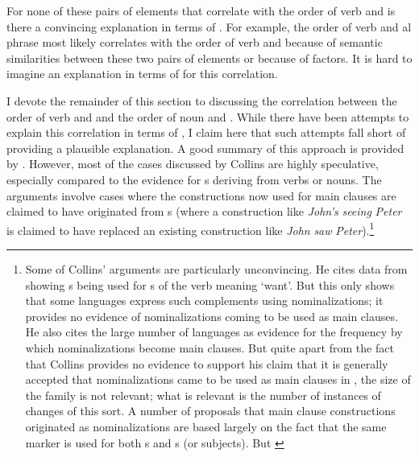 \documentclass[output=paper]{langsci/langscibook}
\begin{document}
For none of these pairs of elements that correlate with the order of verb and  is there a convincing explanation in terms of . For example, the order of verb and al phrase most likely correlates with the order of verb and  because of semantic similarities between these two pairs of elements or because of  factors. It is hard to imagine an explanation in terms of  for this correlation.

I devote the remainder of this section to discussing the correlation between the order of verb and  and the order of noun and . While there have been attempts to explain this correlation in terms of , I claim here that such attempts fall short of providing a plausible explanation. A good summary of this approach is provided by . However, most of the cases discussed by Collins are highly speculative, especially compared to the evidence for s deriving from verbs or nouns. The arguments involve cases where the constructions now used for main clauses are claimed to have originated from s (where a construction like \textit{John’s} \textit{seeing} \textit{Peter} is claimed to have replaced an existing  construction like \textit{John} \textit{saw} \textit{Peter}).\footnote{Some of Collins’ arguments are particularly unconvincing. He cites data from  showing s being used for s of the verb meaning ‘want’. But this only shows that some languages express such complements using nominalizations; it provides no evidence of nominalizations coming to be used as main clauses. He also cites the large number of  languages as evidence for the frequency by which nominalizations become main clauses. But quite apart from the fact that Collins provides no evidence to support his claim that it is generally accepted that nominalizations came to be used as main clauses in , the size of the family is not relevant; what is relevant is the number of instances of changes of this sort. A number of proposals that main clause constructions originated as nominalizations are based largely on the fact that the same  marker is used for both s and s (or  subjects). But
\label{p:dryer:manyotherways}
}
\end{document}
